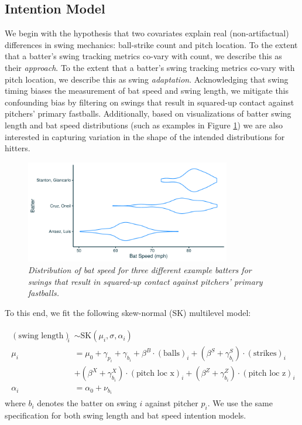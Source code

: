 \documentclass{article}
\begin{document}
    \subsection{Intention Model}
    \label{sec:methods-intention}

    We begin with the hypothesis that two covariates explain real (non-artifactual) differences in swing mechanics: ball-strike count and pitch location. To the extent that a batter's swing tracking metrics co-vary with count, we describe this as their \textit{approach}. To the extent that a batter's swing tracking metrics co-vary with pitch location, we describe this as swing \textit{adaptation}. Acknowledging that swing timing biases the measurement of bat speed and swing length, we mitigate this confounding bias by filtering on swings that result in squared-up contact against pitchers' primary fastballs. Additionally, based on visualizations of batter swing length and bat speed distributions (such as examples in Figure \ref{fig:ex-bat-speed}) we are also interested in capturing variation in the shape of the intended distributions for hitters. 

    \begin{figure}[H]
      \centering
      \includegraphics[width = 0.8\textwidth]{../../figures/ex_speed_intent_distr.pdf}
      \caption{\it Distribution of bat speed for three different example batters for swings that result in squared-up contact against pitchers' primary fastballs.}
      \label{fig:ex-bat-speed}
    \end{figure}

    To this end, we fit the following skew-normal (SK) multilevel model:

    \begin{align}
    \label{eqn:intention-swing-length}
    \begin{split}
        ( \mbox{swing length} )_i &\sim \mbox{SK}(\mu_i, \sigma, \alpha_i) \\
        \mu_i &= \mu_0 + \gamma_{p_i} + \gamma_{b_i}
        + \beta^B \cdot (\mbox{balls})_i
          + (\beta^S + \gamma^S_{b_i}) \cdot (\mbox{strikes})_i\\
        & + (\beta^X + \gamma^X_{b_i}) \cdot (\mbox{pitch loc x})_i
          + (\beta^Z + \gamma^Z_{b_i}) \cdot (\mbox{pitch loc z})_i \\
          \alpha_i &= \alpha_0 + \nu_{b_i}
    \end{split}
    \end{align}
    where $b_i$ denotes the batter on swing $i$ against pitcher $p_i$. We use the same specification for both swing length and bat speed intention models. 
    
\end{document}
